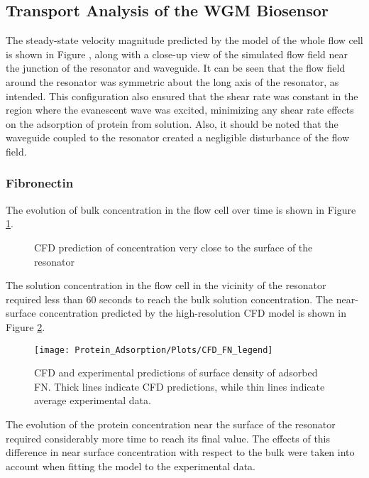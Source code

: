 \subsection{Transport Analysis of the WGM Biosensor}

The steady-state velocity magnitude predicted by the model of the
whole flow cell is shown in Figure , along with a close-up view of
the simulated flow field near the junction of the resonator and waveguide.
It can be seen that the flow field around the resonator was symmetric
about the long axis of the resonator, as intended. This configuration
also ensured that the shear rate was constant in the region where
the evanescent wave was excited, minimizing any shear rate effects
on the adsorption of protein from solution. Also, it should be noted
that the waveguide coupled to the resonator created a negligible disturbance
of the flow field. 


\subsubsection{Fibronectin}

The evolution of bulk concentration in the flow cell over time is
shown in Figure \ref{fig:CFD Bulk Conc}.%
\begin{figure}
\caption{\label{fig:CFD Bulk Conc}CFD prediction of concentration very close
to the surface of the resonator}


%
\end{figure}
 The solution concentration in the flow cell in the vicinity of the
resonator required less than 60 seconds to reach the bulk solution
concentration. The near-surface concentration predicted by the high-resolution
CFD model is shown in Figure \ref{fig:CFD near surface conc}.%
\begin{figure}

\texttt{[image: Protein\_Adsorption/Plots/CFD\_FN\_legend]}

\caption{\label{fig:CFD near surface conc}CFD and experimental predictions
of surface density of adsorbed FN. Thick lines indicate CFD predictions,
while thin lines indicate average experimental data.}


%
\end{figure}
 The evolution of the protein concentration near the surface of the
resonator required considerably more time to reach its final value.
The effects of this difference in near surface concentration with
respect to the bulk were taken into account when fitting the model
to the experimental data.


